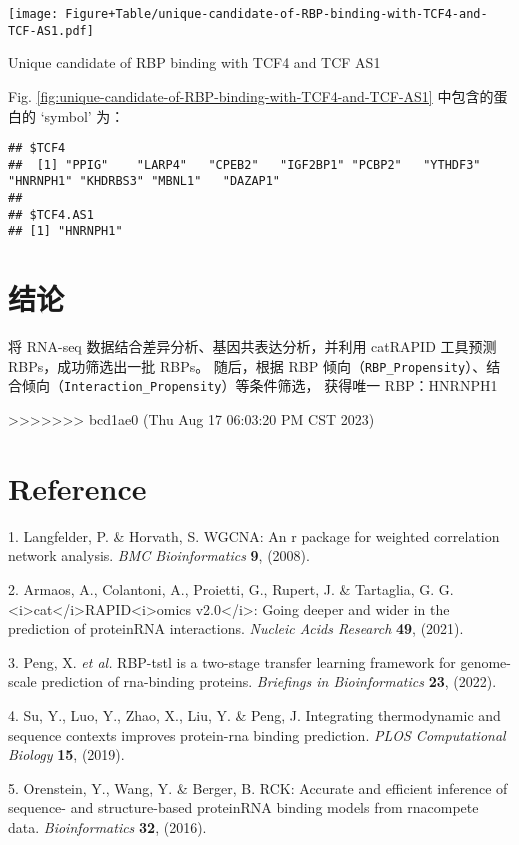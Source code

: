 \documentclass[
]{article}
\newenvironment{cslreferences}%
  {}%
  {\par}
\begin{document}
\def\@captype{figure}
\begin{center}
\texttt{[image: Figure+Table/unique-candidate-of-RBP-binding-with-TCF4-and-TCF-AS1.pdf]}
\caption{Unique candidate of RBP binding with TCF4 and TCF AS1}\label{fig:unique-candidate-of-RBP-binding-with-TCF4-and-TCF-AS1}
\end{center}

Fig. \ref{fig:unique-candidate-of-RBP-binding-with-TCF4-and-TCF-AS1} 中包含的蛋白的 `symbol' 为：

\begin{verbatim}
## $TCF4
##  [1] "PPIG"    "LARP4"   "CPEB2"   "IGF2BP1" "PCBP2"   "YTHDF3"  "HNRNPH1" "KHDRBS3" "MBNL1"   "DAZAP1" 
## 
## $TCF4.AS1
## [1] "HNRNPH1"
\end{verbatim}

\hypertarget{con}{%
\section{结论}\label{con}}

将 RNA-seq 数据结合差异分析、基因共表达分析，并利用 catRAPID 工具预测 RBPs，成功筛选出一批 RBPs。
随后，根据 RBP 倾向（\texttt{RBP\_Propensity}）、结合倾向（\texttt{Interaction\_Propensity}）等条件筛选，
获得唯一 RBP：HNRNPH1

>>>>>>> bcd1ae0 (Thu Aug 17 06:03:20 PM CST 2023)
\hypertarget{bibliography}{%
\section*{Reference}\label{bibliography}}

\hypertarget{refs}{}
\begin{cslreferences}
\leavevmode\hypertarget{ref-WgcnaAnRPacLangfe2008}{}%
1. Langfelder, P. \& Horvath, S. WGCNA: An r package for weighted correlation network analysis. \emph{BMC Bioinformatics} \textbf{9}, (2008).

\leavevmode\hypertarget{ref-ICatIRapidArmaos2021}{}%
2. Armaos, A., Colantoni, A., Proietti, G., Rupert, J. \& Tartaglia, G. G. \textless i\textgreater cat\textless/i\textgreater RAPID\textless i\textgreater omics v2.0\textless/i\textgreater: Going deeper and wider in the prediction of proteinRNA interactions. \emph{Nucleic Acids Research} \textbf{49}, (2021).

\leavevmode\hypertarget{ref-RbpTstlIsATPeng2022}{}%
3. Peng, X. \emph{et al.} RBP-tstl is a two-stage transfer learning framework for genome-scale prediction of rna-binding proteins. \emph{Briefings in Bioinformatics} \textbf{23}, (2022).

\leavevmode\hypertarget{ref-IntegratingTheSuYu2019}{}%
4. Su, Y., Luo, Y., Zhao, X., Liu, Y. \& Peng, J. Integrating thermodynamic and sequence contexts improves protein-rna binding prediction. \emph{PLOS Computational Biology} \textbf{15}, (2019).

\leavevmode\hypertarget{ref-RckAccurateAOrenst2016}{}%
5. Orenstein, Y., Wang, Y. \& Berger, B. RCK: Accurate and efficient inference of sequence- and structure-based proteinRNA binding models from rnacompete data. \emph{Bioinformatics} \textbf{32}, (2016).
\end{cslreferences}
\end{document}
